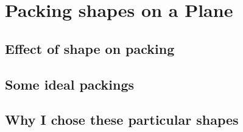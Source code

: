 \chapter{Packing shapes on a Plane}

\section{Effect of shape on packing}

\section{Some ideal packings}

\section{Why I chose these particular shapes}
